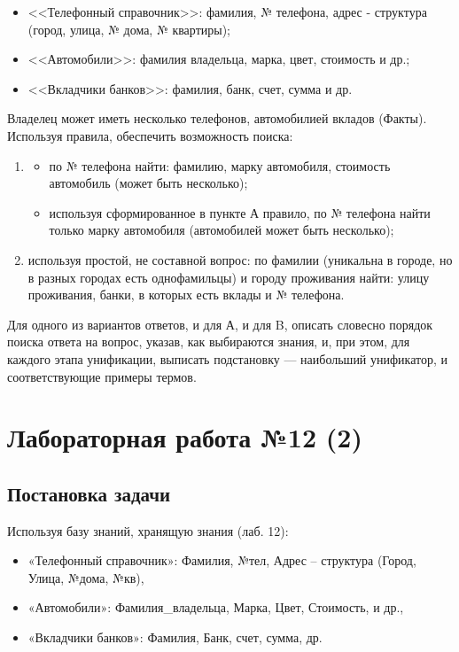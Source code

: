 \documentclass[12pt]{report}
\begin{document}
\begin{itemize}
	\item <<Телефонный справочник>>: фамилия, № телефона, адрес - структура (город, улица, № дома, № квартиры);
	\item <<Автомобили>>: фамилия владельца, марка, цвет, стоимость и др.;
	\item <<Вкладчики банков>>: фамилия, банк, счет, сумма и др.
\end{itemize}

Владелец может иметь несколько телефонов, автомобилией вкладов (Факты). Используя правила, обеспечить возможность поиска:

\begin{enumerate}
	\item \begin{itemize}
		\item по № телефона найти: фамилию, марку автомобиля, стоимость автомобиль (может быть несколько);
		\item используя сформированное в пункте А правило, по № телефона найти только марку автомобиля (автомобилей может быть несколько);
	\end{itemize}
	\item используя простой, не составной вопрос: по фамилии (уникальна в городе, но в разных городах есть однофамильцы) и городу проживания найти: улицу проживания, банки, в которых есть вклады и № телефона.
\end{enumerate}

Для одного из вариантов ответов, и для А, и для B, описать словесно порядок поиска ответа на вопрос, указав, как выбираются знания, и, при этом, для каждого этапа унификации, выписать подстановку — наибольший унификатор, и соответствующие примеры термов.


\chapter*{Лабораторная работа №12 (2)}
\section*{Постановка задачи}

Используя  базу знаний, хранящую знания (лаб. 12):
\begin{itemize}
	\item «Телефонный справочник»: Фамилия, №тел, Адрес – структура (Город, Улица, №дома, №кв),
	\item «Автомобили»: Фамилия\_владельца, Марка, Цвет, Стоимость, и др.,
	\item «Вкладчики банков»: Фамилия, Банк, счет, сумма, др.
\end{itemize}
\end{document}

